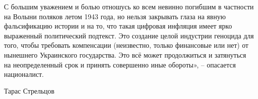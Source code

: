 С большим уважением и болью отношусь ко всем невинно погибшим в частности на
Волыни поляков летом 1943 года, но нельзя закрывать глаза на явную
фальсификацию истории и на то, что такая цифровая инфляция имеет ярко
выраженный политический подтекст. Это создание целой индустрии геноцида для
того, чтобы требовать компенсации (неизвестно, только финансовые или нет) от
нынешнего Украинского государства. Это всё может продолжиться и затянуться на
неопределенный срок и принять совершенно иные обороты», – опасается
националист.

Тарас Стрельцов 
